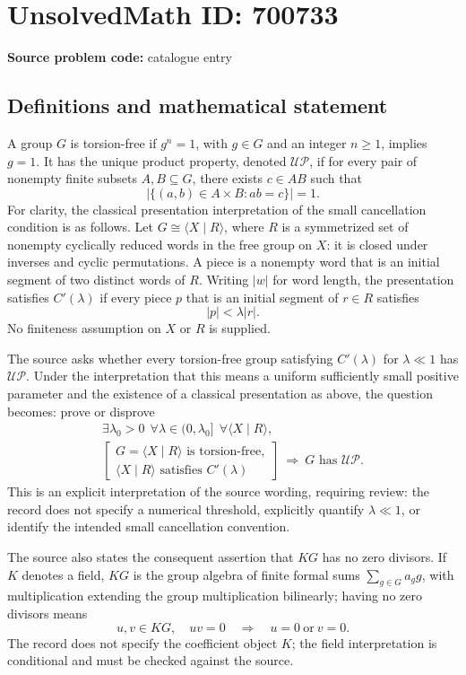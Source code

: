 \documentclass[11pt]{article}
\begin{document}
\section*{UnsolvedMath ID: 700733}
\textbf{Source problem code:} catalogue entry
\subsection{Definitions and mathematical statement}
A group \(G\) is torsion-free if \(g^n=1\), with \(g\in G\) and an integer \(n\geq 1\), implies \(g=1\). It has the unique product property, denoted \(\mathcal{UP}\), if for every pair of nonempty finite subsets \(A,B\subseteq G\), there exists \(c\in AB\) such that
\[
\bigl|\{(a,b)\in A\times B:ab=c\}\bigr|=1.
\]
For clarity, the classical presentation interpretation of the small cancellation condition is as follows. Let \(G\cong\langle X\mid R\rangle\), where \(R\) is a symmetrized set of nonempty cyclically reduced words in the free group on \(X\): it is closed under inverses and cyclic permutations. A piece is a nonempty word that is an initial segment of two distinct words of \(R\). Writing \(|w|\) for word length, the presentation satisfies \(C'(\lambda)\) if every piece \(p\) that is an initial segment of \(r\in R\) satisfies
\[
|p|<\lambda |r|.
\]
No finiteness assumption on \(X\) or \(R\) is supplied.

The source asks whether every torsion-free group satisfying \(C'(\lambda)\) for \(\lambda\ll 1\) has \(\mathcal{UP}\). Under the interpretation that this means a uniform sufficiently small positive parameter and the existence of a classical presentation as above, the question becomes: prove or disprove
\[
\begin{gathered}
\exists\lambda_0>0\ \ \forall\lambda\in(0,\lambda_0]\ \ \forall\langle X\mid R\rangle,\\
\left[\begin{array}{c}
G=\langle X\mid R\rangle\text{ is torsion-free},\\
\langle X\mid R\rangle\text{ satisfies }C'(\lambda)
\end{array}\right]
\ \Longrightarrow\ G\text{ has }\mathcal{UP}.
\end{gathered}
\]
This is an explicit interpretation of the source wording, requiring review: the record does not specify a numerical threshold, explicitly quantify \(\lambda\ll1\), or identify the intended small cancellation convention.

The source also states the consequent assertion that \(KG\) has no zero divisors. If \(K\) denotes a field, \(KG\) is the group algebra of finite formal sums \(\sum_{g\in G}a_g g\), with multiplication extending the group multiplication bilinearly; having no zero divisors means
\[
u,v\in KG,\quad uv=0\quad\Longrightarrow\quad u=0\ \text{or}\ v=0.
\]
The record does not specify the coefficient object \(K\); the field interpretation is conditional and must be checked against the source.
\end{document}
